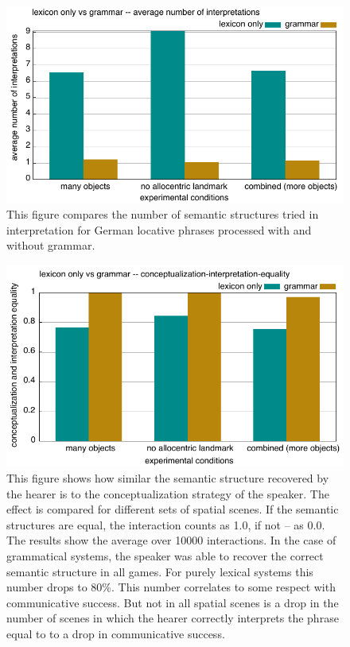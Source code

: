\begin{figure}
\begin{center}
\includegraphics[width=0.9\columnwidth]{figs/why-grammar-german-avg-interpretations}
\end{center}
\caption[Comparison average number of interpretations]{
This figure compares the number of semantic 
structures tried in interpretation for German locative 
phrases processed 
with and without grammar.}
\label{f:why-grammar-german-interpretation-1}
\end{figure}

\begin{figure}
\begin{center}
\includegraphics[width=1.0\columnwidth]{figs/why-grammar-conceptualization-interpretation-equality}
\caption[Comparison interpretation equality]{
This figure shows how similar the semantic structure 
recovered by the hearer is to the conceptualization strategy of 
the speaker. The effect is compared for different sets of spatial scenes. 
If the semantic structures are equal, the interaction counts as 1.0, if 
not -- as 0.0. The results show the average over 10000 interactions. 
In the case of grammatical systems, the speaker was able to recover the correct semantic structure
in all games. For purely lexical systems this number drops to 80\%. This number correlates
to some respect with communicative success. But not in all spatial scenes is a drop 
in the number of scenes in which the hearer correctly interprets the phrase equal to
to a drop in communicative success.}
\label{f:why-grammar-german-interpretation-2}
\end{center}
\end{figure}

